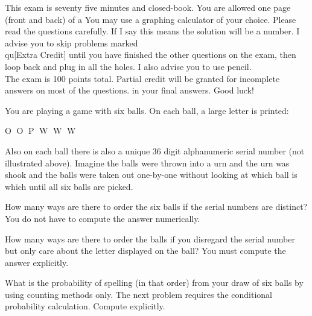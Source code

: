 \documentclass[12pt]{article}
\begin{document}
This exam is seventy five minutes and closed-book. You are allowed one page (front and back) of a  You may use a graphing calculator of your choice. Please read the questions carefully. If I say  this means the solution will be a number. I advise you to skip problems marked \\qu{[Extra Credit]} until you have finished the other questions on the exam, then loop back and plug in all the holes. I also advise you to use pencil.\\

\noindent The exam is 100 points total. Partial credit will be granted for incomplete answers on most of the questions.  in your final answers. Good luck!

\pagebreak

\problem You are playing a game with six balls. On each ball, a large letter is printed:

\begin{center}
\Huge\textcircled{\large O}
\Huge\textcircled{\large O}
\Huge\textcircled{\large P}
\Huge\textcircled{\large W}
\Huge\textcircled{\large W}
\Huge\textcircled{\large W}
\end{center}

\normalsize
\noindent Also on each ball there is also a unique 36 digit alphanumeric serial number (not illustrated above). Imagine the balls were thrown into a urn and the urn was shook and the balls were taken out one-by-one without looking at which ball is which until all six balls are picked.

\benum
{} How many ways are there to order the six balls if the serial numbers are distinct? You do not have to compute the answer numerically. 

 How many ways are there to order the balls if you disregard the serial number but only care about the letter displayed on the ball? You must compute the answer explicitly. 

 What is the probability of spelling  (in that order) from your draw of six balls by using counting methods only. The next problem requires the conditional probability calculation. Compute explicitly.
\end{document}
